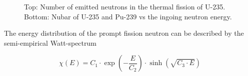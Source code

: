 \begin{figure}[ht!]
\protect {}\protect
\caption{\label{fig:nu} \footnotesize{Top: Number of emitted neutrons in the thermal fission of U-235. Bottom: Nubar of U-235 and Pu-239 vs the ingoing neutron energy.}}
\end{figure}

The energy distribution of the prompt fission neutron can be described by the semi-empirical Watt-spectrum 

\begin{equation}
\chi(E)=C_1\cdot \exp(-\frac{E}{C_2})\cdot \sinh(\sqrt{C_3\cdot E})
\end{equation}

